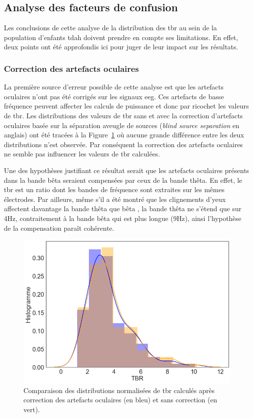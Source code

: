 \subsection{Analyse des facteurs de confusion}

Les conclusions de cette analyse de la distribution des \gls{tbr} au sein de la population d'enfants \gls{tdah} doivent prendre en compte ses limitations.
En effet, deux points ont été approfondis ici pour juger de leur impact sur les résultats.

\subsubsection{Correction des artefacts oculaires}

La première source d'erreur possible de cette analyse est que les artefacts oculaires n'ont pas été corrigés sur les signaux \gls{eeg}. Ces artefacts de basse fréquence
peuvent affecter les calculs de puissance et donc par ricochet les valeurs de \gls{tbr}. Les distributions des valeurs de \gls{tbr} sans et avec 
la correction d'artefacts oculaires basée sur la séparation aveugle de sources (\textit{blind source separation} en anglais) \citep{Barthelemy2017} 
ont été tracées à la Figure~\ref{Figure:tbr_eye_artifact_correction} où aucune grande différence entre les deux distributions n'est observée. Par conséquent la correction des artefacts 
oculaires ne semble pas influencer les valeurs de \gls{tbr} calculées. 

Une des hypothèses justifiant ce 
résultat serait que les artefacts oculaires présents dans la bande bêta seraient compensées par ceux de la bande thêta. En effet, le \gls{tbr} est un ratio dont les bandes de
fréquence sont extraites sur les mêmes électrodes. Par ailleurs, même s'il a été montré que les clignements d'yeux affectent davantage la bande thêta que bêta \citep{Barthelemy2017},
la bande thêta ne s'étend que sur 4Hz, contraitement à la bande bêta qui est plus longue (9Hz), ainsi l'hypothèse de la compensation paraît cohérente.


\begin{figure}[h!]
  \centering
	\includegraphics[width=0.7\linewidth]{figures/chapter-4/tbr-eye-artifact-correction} 
  \caption{Comparaison des distributions normalisées de \gls{tbr} calculés après correction des artefacts oculaires (en bleu) et sans correction (en vert).}
  \label{Figure:tbr_eye_artifact_correction}
\end{figure}

